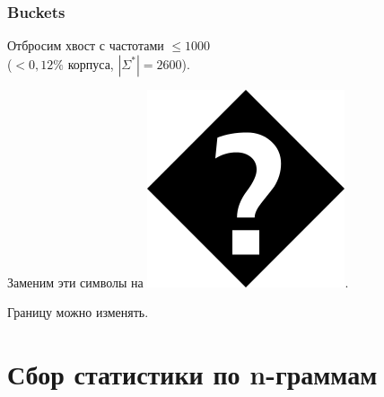 \documentclass[14pt]{beamer}
\begin{document}
\begin{frame}
	\frametitle{Buckets}
	Отбросим хвост с частотами $\leq 1000$ \\ ($<0,12\%$ корпуса, $|\Sigma^*| = 2600$).
	
	Заменим эти символы на \includegraphics[scale=0.05]{fffd}.
	\begin{figure}[h]
	\end{figure}

	Границу можно изменять.
\end{frame}

\section{Сбор статистики по n-граммам}
\end{document}
